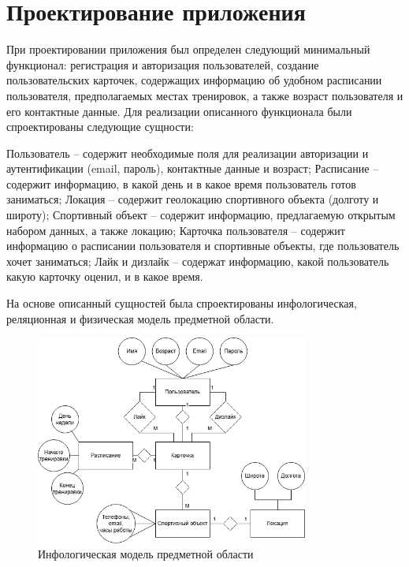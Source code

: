\documentclass[14pt]{article}
\begin{document}
\section*{ Проектирование приложения}
При проектировании приложения был определен следующий минимальный функционал: регистрация и авторизация пользователей, создание пользовательских карточек, содержащих информацию об удобном расписании пользователя, предполагаемых местах тренировок, а также возраст пользователя и его контактные данные.
Для реализации описанного функционала были спроектированы следующие сущности:
\begin{itemize}
	\link Пользователь – содержит необходимые поля для реализации авторизации и аутентификации (email, пароль), контактные данные и возраст;
	\link Расписание – содержит информацию, в какой день и в какое время пользователь готов заниматься;
	\link Локация – содержит геолокацию спортивного объекта (долготу и широту);
	\link Спортивный объект – содержит информацию, предлагаемую открытым набором данных, а также локацию;
	\link Карточка пользователя – содержит информацию о расписании пользователя и спортивные объекты, где пользователь хочет заниматься;
	\link Лайк и дизлайк – содержат информацию, какой пользователь какую карточку оценил, и в какое время.
\end{itemize}
На основе описанный сущностей была спроектированы инфологическая, реляционная и физическая модель предметной области.

\begin{figure}[H!]
	\centering
	\includegraphics[width=0.8\textwidth]{fig1.png}
	\caption{Инфологическая модель предметной области}
\end{figure}
\end{document}
